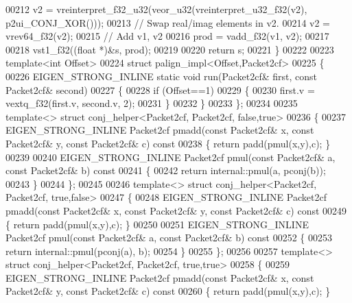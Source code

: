 \begin{DoxyCode}
00212   v2 = vreinterpret\_f32\_u32(veor\_u32(vreinterpret\_u32\_f32(v2), p2ui\_CONJ\_XOR()));
00213   \textcolor{comment}{// Swap real/imag elements in v2.}
00214   v2 = vrev64\_f32(v2);
00215   \textcolor{comment}{// Add v1, v2}
00216   prod = vadd\_f32(v1, v2);
00217 
00218   vst1\_f32((\textcolor{keywordtype}{float} *)&s, prod);
00219 
00220   \textcolor{keywordflow}{return} s;
00221 \}
00222 
00223 \textcolor{keyword}{template}<\textcolor{keywordtype}{int} Offset>
00224 \textcolor{keyword}{struct }palign\_impl<Offset,Packet2cf>
00225 \{
00226   EIGEN\_STRONG\_INLINE \textcolor{keyword}{static} \textcolor{keywordtype}{void} run(Packet2cf& first, \textcolor{keyword}{const} Packet2cf& second)
00227   \{
00228     \textcolor{keywordflow}{if} (Offset==1)
00229     \{
00230       first.v = vextq\_f32(first.v, second.v, 2);
00231     \}
00232   \}
00233 \};
00234 
00235 \textcolor{keyword}{template}<> \textcolor{keyword}{struct }conj\_helper<Packet2cf, Packet2cf, false,true>
00236 \{
00237   EIGEN\_STRONG\_INLINE Packet2cf pmadd(\textcolor{keyword}{const} Packet2cf& x, \textcolor{keyword}{const} Packet2cf& y, \textcolor{keyword}{const} Packet2cf& c)\textcolor{keyword}{ const}
00238 \textcolor{keyword}{  }\{ \textcolor{keywordflow}{return} padd(pmul(x,y),c); \}
00239 
00240   EIGEN\_STRONG\_INLINE Packet2cf pmul(\textcolor{keyword}{const} Packet2cf& a, \textcolor{keyword}{const} Packet2cf& b)\textcolor{keyword}{ const}
00241 \textcolor{keyword}{  }\{
00242     \textcolor{keywordflow}{return} internal::pmul(a, pconj(b));
00243   \}
00244 \};
00245 
00246 \textcolor{keyword}{template}<> \textcolor{keyword}{struct }conj\_helper<Packet2cf, Packet2cf, true,false>
00247 \{
00248   EIGEN\_STRONG\_INLINE Packet2cf pmadd(\textcolor{keyword}{const} Packet2cf& x, \textcolor{keyword}{const} Packet2cf& y, \textcolor{keyword}{const} Packet2cf& c)\textcolor{keyword}{ const}
00249 \textcolor{keyword}{  }\{ \textcolor{keywordflow}{return} padd(pmul(x,y),c); \}
00250 
00251   EIGEN\_STRONG\_INLINE Packet2cf pmul(\textcolor{keyword}{const} Packet2cf& a, \textcolor{keyword}{const} Packet2cf& b)\textcolor{keyword}{ const}
00252 \textcolor{keyword}{  }\{
00253     \textcolor{keywordflow}{return} internal::pmul(pconj(a), b);
00254   \}
00255 \};
00256 
00257 \textcolor{keyword}{template}<> \textcolor{keyword}{struct }conj\_helper<Packet2cf, Packet2cf, true,true>
00258 \{
00259   EIGEN\_STRONG\_INLINE Packet2cf pmadd(\textcolor{keyword}{const} Packet2cf& x, \textcolor{keyword}{const} Packet2cf& y, \textcolor{keyword}{const} Packet2cf& c)\textcolor{keyword}{ const}
00260 \textcolor{keyword}{  }\{ \textcolor{keywordflow}{return} padd(pmul(x,y),c); \}

\end{DoxyCode}
